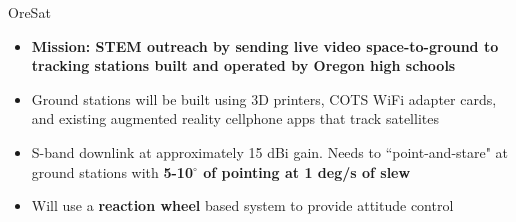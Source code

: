 \documentclass[slidestop,compress]{beamer}
\begin{document}
\begin{frame}[plain]
\begin{block}{\centering OreSat}
\hspace{1 mm}
\begin{itemize}
\item {\bf Mission: STEM outreach by sending live video space-to-ground to tracking stations built and operated by Oregon high schools}
\item Ground stations will be built using 3D printers, COTS WiFi adapter cards, and existing augmented reality cellphone apps that track satellites
\item S-band downlink at approximately 15 dBi gain. Needs to ``point-and-stare" at ground stations with {\bf 5-10$^{\circ}$ of pointing at 1 deg/s of slew}
\item Will use a {\bf{reaction wheel}} based system to provide attitude control

\end{itemize}
\end{block}    
\end{frame}
\end{document}
